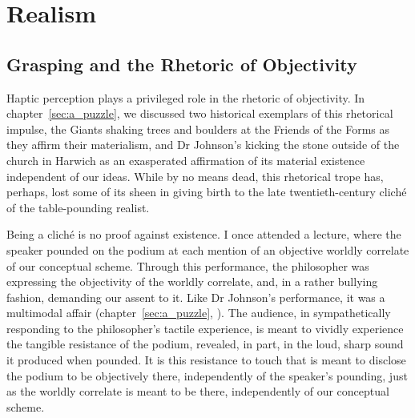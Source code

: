 \chapter{Realism} %
\label{cha:realism}

\section{Grasping and the Rhetoric of Objectivity} %
\label{sec:grasping_and_the_rhetoric_of_objectivity}

Haptic perception plays a privileged role in the rhetoric of objectivity. In chapter~\ref{sec:a_puzzle}, we discussed two historical exemplars of this rhetorical impulse, the Giants shaking trees and boulders at the Friends of the Forms as they affirm their materialism, and Dr Johnson's kicking the stone outside of the church in Harwich as an exasperated affirmation of its material existence independent of our ideas. While by no means dead, this rhetorical trope has, perhaps, lost some of its sheen in giving birth to the late twentieth-century clich\'{e} of the table-pounding realist.

Being a clich\'{e} is no proof against existence. I once attended a lecture, where the speaker pounded on the podium at each mention of an objective worldly correlate of our conceptual scheme. Through this performance, the philosopher was expressing the objectivity of the worldly correlate, and, in a rather bullying fashion, demanding our assent to it. Like Dr Johnson's performance, it was a multimodal affair (chapter~\ref{sec:a_puzzle}, \citealt[71]{Campbell:2014aa}). The audience, in sympathetically responding to the philosopher's tactile experience, is meant to vividly experience the tangible resistance of the podium, revealed, in part, in the loud, sharp sound it produced when pounded. It is this resistance to touch that is meant to disclose the podium to be objectively there, independently of the speaker's pounding, just as the worldly correlate is meant to be there, independently of our conceptual scheme.

